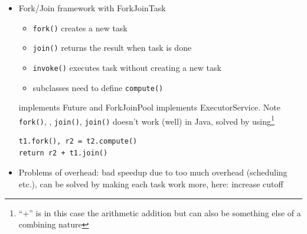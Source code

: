 \documentclass[a4paper]{article}
\newcommand{\inline}[1]{\lstinline!#1!}%
\begin{document}
\begin{itemize}
\item Fork/Join framework with ForkJoinTask 
\begin{itemize}
\item \inline{fork()} creates a new task
\item \inline{join()} returns the result when task is done
\item \inline{invoke()} executes task without creating a new task
\item subclasses need to define \inline{compute()}
\end{itemize}
implements Future and ForkJoinPool implements ExecutorService. Note \inline{fork()}, , \inline{join()}, \inline{join()} doesn’t work (well) in Java, solved by using\footnote{``+'' is in this case the arithmetic addition but can also be something else of a combining nature}
\begin{lstlisting}
t1.fork(), r2 = t2.compute()
return r2 + t1.join()
\end{lstlisting}
\item Problems of overhead: bad speedup due to too much overhead (scheduling etc.), can be solved by making each task work more, here: increase cutoff
\end{itemize}
\end{document}
